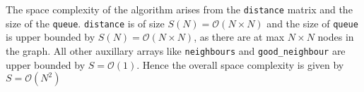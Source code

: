 \documentclass[10pt, a4paper]{article}
\newcommand{\BigO}{\mathcal{O}}
\begin{document}
The space complexity of the algorithm arises from the \lstinline{distance} matrix and the size of the \lstinline{queue}. \lstinline{distance} is of size $S(N) = \BigO(N\times N)$ and the size of \lstinline{queue} is upper bounded by $S(N) = \BigO(N\times N)$, as there are at max $N\times N$ nodes in the graph. All other auxillary arrays like \lstinline{neighbours} and \lstinline{good_neighbour} are upper bounded by $S = \BigO(1)$. Hence the overall space complexity is given by $S = \BigO(N^2)$
\end{document}
